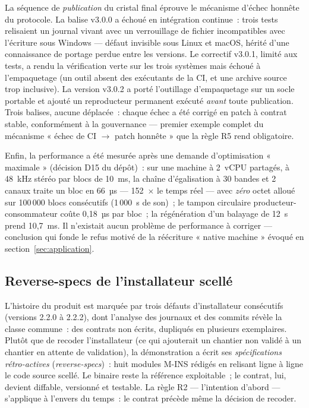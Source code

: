 La séquence de \emph{publication} du cristal final éprouve le mécanisme
d’échec honnête du protocole. La balise v3.0.0 a échoué en intégration
continue~: trois tests relisaient un journal vivant avec un verrouillage de
fichier incompatibles avec l’écriture sous Windows — défaut invisible sous
Linux et macOS, hérité d’une connaissance de portage perdue entre les
versions. Le correctif v3.0.1, limité aux tests, a rendu la vérification
verte sur les trois systèmes mais échoué à l’empaquetage (un outil absent
des exécutants de la CI, et une archive source trop inclusive). La version
v3.0.2 a porté l’outillage d’empaquetage sur un socle portable et ajouté
un reproducteur permanent exécuté \emph{avant} toute publication. Trois
balises, aucune déplacée~: chaque échec a été corrigé en patch à contrat
stable, conformément à la gouvernance — premier exemple complet du
mécanisme « échec de CI $\to$ patch honnête » que la règle R5 rend
obligatoire.

Enfin, la performance a été mesurée après une demande d’optimisation
« maximale » (décision D15 du dépôt)~: sur une machine à 2~vCPU partagés,
à 48~kHz stéréo par blocs de 10~ms, la chaîne d’égalisation à 30 bandes et
2 canaux traite un bloc en 66~µs — 152~$\times$ le temps réel — avec
\emph{zéro} octet alloué sur 100\,000 blocs consécutifs (1\,000~s de son)~;
le tampon circulaire producteur-consommateur coûte 0,18~µs par bloc~; la
régénération d’un balayage de 12~s prend 10,7~ms. Il n’existait aucun
problème de performance à corriger — conclusion qui fonde le refus motivé
de la réécriture « native machine » évoqué en
section~\ref{sec:application}.

\subsection{Reverse-specs de l’installateur scellé}\label{sec:reverse}

L’histoire du produit est marquée par trois défauts d’installateur
consécutifs (versions 2.2.0 à 2.2.2), dont l’analyse des journaux et des
commits révèle la classe commune~: des contrats non écrits, dupliqués en
plusieurs exemplaires. Plutôt que de recoder l’installateur (ce qui
ajouterait un chantier non validé à un chantier en attente de validation),
la démonstration a écrit ses \emph{spécifications rétro-actives}
(\emph{reverse-specs})~: huit modules M-INS rédigés en relisant ligne à
ligne le code source scellé. Le binaire reste la référence
exploitable~; le contrat, lui, devient diffable, versionné et testable. La
règle R2 — l’intention d’abord — s’applique à l’envers du temps~: le
contrat précède même la décision de recoder.

